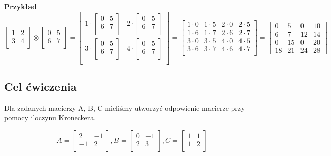		\textbf{Przykład}
	$$\begin{bmatrix}1&2\\3&4\\\end{bmatrix}\otimes {\begin{bmatrix}0&5\\6&7\\\end{bmatrix}}={\begin{bmatrix}1\cdot {\begin{bmatrix}0&5\\6&7\\\end{bmatrix}}&2\cdot {\begin{bmatrix}0&5\\6&7\\\end{bmatrix}}\\3\cdot {\begin{bmatrix}0&5\\6&7\\\end{bmatrix}}&4\cdot {\begin{bmatrix}0&5\\6&7\\\end{bmatrix}}\\\end{bmatrix}}={\begin{bmatrix}1\cdot 0&1\cdot 5&2\cdot 0&2\cdot 5\\1\cdot 6&1\cdot 7&2\cdot 6&2\cdot 7\\3\cdot 0&3\cdot 5&4\cdot 0&4\cdot 5\\3\cdot 6&3\cdot 7&4\cdot 6&4\cdot 7\\\end{bmatrix}}={\begin{bmatrix}0&5&0&10\\6&7&12&14\\0&15&0&20\\18&21&24&28\end{bmatrix}}$$
	
	\subsection{Cel ćwiczenia}
	Dla zadanych macierzy A, B, C mieliśmy utworzyć odpowienie macierze przy pomocy iloczynu Kroneckera.
	
		$$A = \begin{bmatrix}2&-1\\-1&2\\\end{bmatrix},  B = \begin{bmatrix}0&-1\\2&3\\\end{bmatrix},  C = \begin{bmatrix}1&1\\1&2\\\end{bmatrix} $$
	

